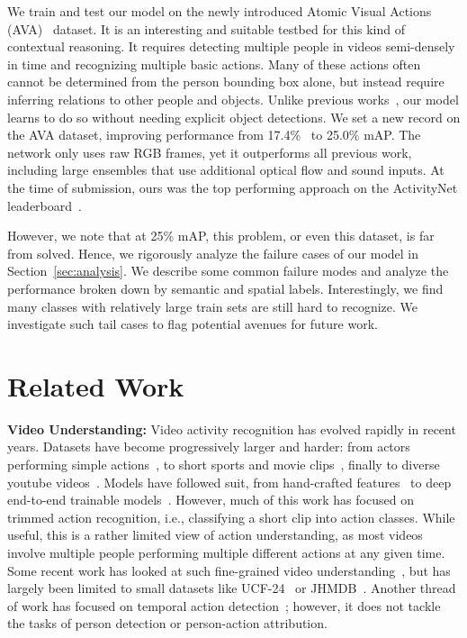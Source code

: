 \documentclass[10pt,twocolumn,letterpaper]{article}
\begin{document}
We train and test our model on the newly introduced Atomic Visual Actions
(AVA)~\cite{gu2018ava} dataset. It
is an interesting and suitable testbed for this kind of contextual reasoning. It requires detecting multiple people in videos semi-densely in time and recognizing multiple basic actions. Many of these actions often cannot be determined from the person bounding box alone, but instead require inferring relations
to other people and objects. Unlike previous works~\cite{baradel2018object},
our model learns to do so without needing explicit object detections.
We set a new record on the 
AVA dataset, improving performance from 17.4\%~\cite{sun2018arcn} to 25.0\% mAP. The network 
only uses raw RGB frames, yet it
outperforms all previous work, including large ensembles that use additional optical flow and sound inputs. At the time of submission, ours was the top performing approach on the ActivityNet leaderboard~\cite{ava_leaderboard}. 

However, we note that at 25\% mAP, this problem, or even this dataset, is far from solved.
Hence, we rigorously analyze the failure cases of our model in Section~\ref{sec:analysis}. We 
describe some common failure modes and analyze the performance broken down by semantic and spatial labels. 
Interestingly, we find many classes with relatively large train sets are still hard to recognize. 
We investigate such tail cases to flag potential avenues for future work.

 \section{Related Work}

{\noindent \bf Video Understanding:} Video activity recognition has
evolved rapidly in recent years. Datasets have become progressively
larger and harder: from actors performing simple
actions~\cite{gorelick2007weizmann,schuldt2004kth}, to short sports
and movie clips~\cite{ucf101,hmdb51}, finally to diverse youtube
videos~\cite{kay2017kinetics,youtube8M}. Models have followed suit, from
hand-crafted features~\cite{laptev2005space,IDT_Wang_13} to deep
end-to-end trainable
models~\cite{Karpathy_14,WangL_16a,carreira2017quo,xie2017rethinking,wang2017non}.
However, much of this work has focused on trimmed action recognition,
i.e., classifying a short clip into action classes. While useful, this
is a rather limited view of action understanding, as most videos
involve multiple people  performing multiple different actions at any
given time.  Some recent work has looked at such fine-grained video
understanding~\cite{singh2017online,hou2017tube,duarte2018videocapsule,kalogeiton2017action},
but has largely been limited to small datasets like
UCF-24~\cite{ucf101,singh2017online} or JHMDB~\cite{Jhuang2013JHMDB}.
Another thread of work has focused on temporal action
detection~\cite{charades,sigurdsson2017asynchronous,xu2017rc3d};
however, it does not tackle the tasks of person detection or person-action
attribution.
\end{document}
